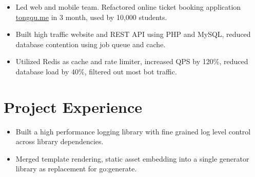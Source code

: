 \documentclass[11pt, letterpaper]{simple-cv}
\begin{document}

\begin{itemize}
	\item Led web and mobile team. Refactored online ticket booking application \href{https://tongqu.me}{tongqu.me} in 3 month, used by 10,000 students.
	\item Built high traffic website and REST API using PHP and MySQL, reduced database contention using job queue and cache.
	\item Utilized Redis as cache and rate limiter, increased QPS by 120\%, reduced database load by 40\%, filtered out most bot traffic.
\end{itemize}

\section{Project Experience}



\begin{itemize}
	\item Built a high performance logging library with fine grained log level control across library dependencies.
	\item Merged template rendering, static asset embedding into a single generator library as replacement for go:generate.
\end{itemize}
\end{document}
